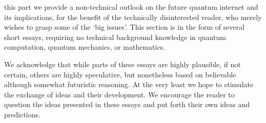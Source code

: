 %
%

 this part we provide a non-technical outlook on the future quantum internet and its implications, for the benefit of the technically disinterested reader, who merely wishes to grasp some of the `big issues'. This section is in the form of several short essays, requiring no technical background knowledge in quantum computation, quantum mechanics, or mathematics. 

We acknowledge that while parts of these essays are highly plausible, if not certain, others are highly speculative, but nonetheless based on believable although somewhat futuristic reasoning. At the very least we hope to stimulate the exchange of ideas and their development. We encourage the reader to question the ideas presented in these essays and put forth their own ideas and predictions.


%
%




%
%




%
%




%
%



%
%




%
%




